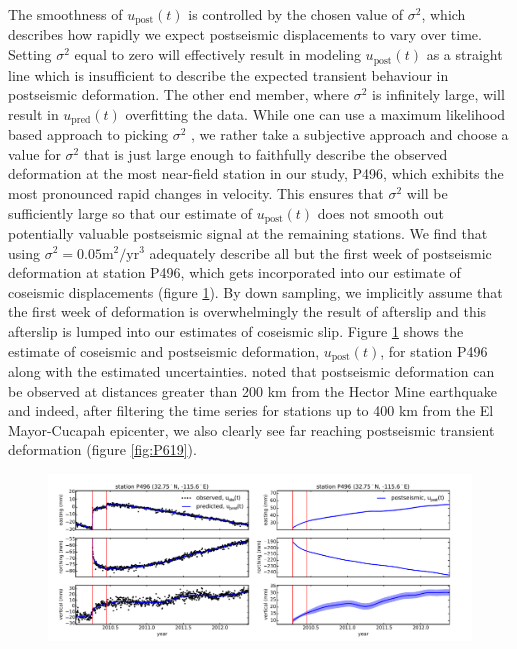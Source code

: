 \documentclass[1p]{elsarticle}
\begin{document}
The smoothness of $u_\mathrm{post}(t)$ is controlled by the chosen value of $\sigma^2$, which describes how rapidly we expect postseismic displacements to vary over time.  Setting $\sigma^2$ equal to zero will effectively result in modeling $u_\mathrm{post}(t)$ as a straight line which is insufficient to describe the expected transient behaviour in postseismic deformation. The other end member, where $\sigma^2$ is infinitely large, will result in $u_\mathrm{pred}(t)$ overfitting the data. While one can use a maximum likelihood based approach to picking $\sigma^2$ \citep[e.g.][]{Segall1997}, we rather take a subjective approach and choose a value for $\sigma^2$ that is just large enough to faithfully describe the observed deformation at the most near-field station in our study, P496, which exhibits the most pronounced rapid changes in velocity. This ensures that $\sigma^2$ will be sufficiently large so that our estimate of $u_\mathrm{post}(t)$ does not smooth out potentially valuable postseismic signal at the remaining stations. We find that using $\sigma^2 = 0.05 \mathrm{m}^2 / \mathrm{yr}^3$ adequately describe all but the first week of postseismic deformation at station P496, which gets incorporated into our estimate of coseismic displacements (figure \ref{fig:P496}). By down sampling, we implicitly assume that the first week of deformation is overwhelmingly the result of afterslip and this afterslip is lumped into our estimates of coseismic slip.  Figure \ref{fig:P496} shows the estimate of coseismic and postseismic deformation, $u_\mathrm{post}(t)$, for station P496 along with the estimated uncertainties. \cite{Freed2007a} noted that postseismic deformation can be observed at distances greater than 200 km from the Hector Mine earthquake and indeed, after filtering the time series for stations up to 400 km from the El Mayor-Cucapah epicenter, we also clearly see far reaching postseismic transient deformation (figure \ref{fig:P619}).      

\begin{figure}
\includegraphics[scale=0.7]{Figures/FilterP496}
\centering
\caption{}
\label{fig:P496}
\end{figure}
\end{document}
